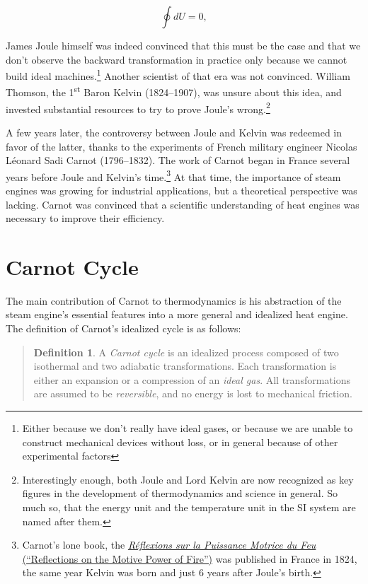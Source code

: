 \documentclass[
  9pt,
]{extbook}
\theoremstyle{definition}
\newtheorem{definition}{Definition}[chapter]
\theoremstyle{definition}
\theoremstyle{definition}
\theoremstyle{remark}
\begin{document}
\begin{equation}
  \oint dU=0,
  \label{eq:de0c}
\end{equation}

James Joule himself was indeed convinced that this must be the case and that we don't observe the backward transformation in practice only because we cannot build ideal machines.\footnote{Either because we don't really have ideal gases, or because we are unable to construct mechanical devices without loss, or in general because of other experimental factors} Another scientist of that era was not convinced. William Thomson, the 1\textsuperscript{st} Baron Kelvin (1824--1907), was unsure about this idea, and invested substantial resources to try to prove Joule's wrong.\footnote{Interestingly enough, both Joule and Lord Kelvin are now recognized as key figures in the development of thermodynamics and science in general. So much so, that the energy unit and the temperature unit in the SI system are named after them.}

A few years later, the controversy between Joule and Kelvin was redeemed in favor of the latter, thanks to the experiments of French military engineer Nicolas Léonard Sadi Carnot (1796--1832). The work of Carnot began in France several years before Joule and Kelvin's time.\footnote{Carnot's lone book, the \href{https://en.wikipedia.org/wiki/Reflections_on_the_Motive_Power_of_Fire}{\emph{Réflexions sur la Puissance Motrice du Feu} (``Reflections on the Motive Power of Fire'')} was published in France in 1824, the same year Kelvin was born and just 6 years after Joule's birth.} At that time, the importance of steam engines was growing for industrial applications, but a theoretical perspective was lacking. Carnot was convinced that a scientific understanding of heat engines was necessary to improve their efficiency.

\hypertarget{carnotcyclesect}{%
\section{Carnot Cycle}\label{carnotcyclesect}}

The main contribution of Carnot to thermodynamics is his abstraction of the steam engine's essential features into a more general and idealized heat engine. The definition of Carnot's idealized cycle is as follows:

\begin{quote}
\begin{definition}
\protect\hypertarget{def:carnotcycle}{}{\label{def:carnotcycle} }
A \emph{Carnot cycle} is an idealized process composed of two isothermal and two adiabatic transformations. Each transformation is either an expansion or a compression of an \emph{ideal gas}. All transformations are assumed to be \emph{reversible}, and no energy is lost to mechanical friction.
\end{definition}
\end{quote}
\end{document}
